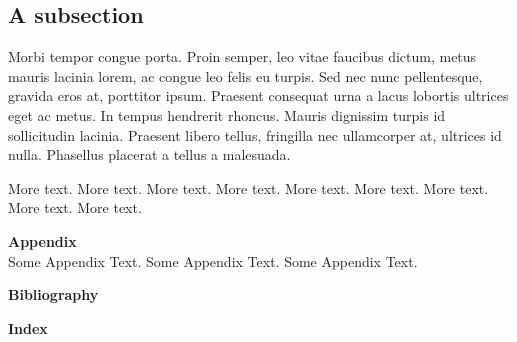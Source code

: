\documentclass[11pt,titlepage,twoside,openright]{report}
\begin{document}
\subsection[Subsection Name]{A subsection}

Morbi tempor congue porta. Proin semper, leo vitae faucibus dictum, metus mauris lacinia lorem, ac congue leo felis eu turpis. Sed nec nunc pellentesque, gravida eros at, porttitor ipsum. Praesent consequat urna a lacus lobortis ultrices eget ac metus. In tempus hendrerit rhoncus. Mauris dignissim turpis id sollicitudin lacinia. Praesent libero tellus, fringilla nec ullamcorper at, ultrices id nulla. Phasellus placerat a tellus a malesuada.

More text. More text. More text.  More text. More text. More text. More text. More text. More text. 



%
%

\cleardoublepage
{} %
{\textbf{\LARGE{Appendix}}}\\ %

Some Appendix Text.  Some Appendix Text. Some Appendix Text.


%
%

\cleardoublepage
{} %


{\textbf{\LARGE{Bibliography}}}\\	%
\nocite{*} %
%




%
%

\cleardoublepage
{} %
{\textbf{\LARGE{Index}}}\\ %
\printindex
\printglossaries
\end{document}
